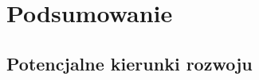 \chapter{Podsumowanie}
\label{cha:summary}

\section{Potencjalne kierunki rozwoju}
\label{sec:future}